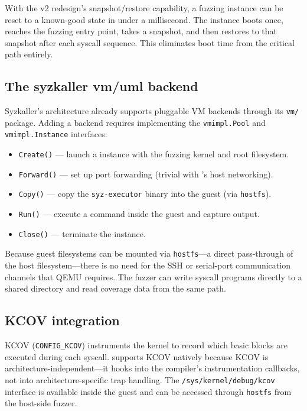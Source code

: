 With the v2 redesign's snapshot/restore capability, a \UML{} fuzzing
instance can be reset to a known-good state in under a millisecond.
The instance boots once, reaches the fuzzing entry point, takes a
snapshot, and then restores to that snapshot after each syscall sequence.
This eliminates boot time from the critical path entirely.

\subsection{The syzkaller vm/uml backend}

Syzkaller's architecture already supports pluggable VM backends through
its \texttt{vm/} package.  Adding a \UML{} backend requires implementing
the \texttt{vmimpl.Pool} and \texttt{vmimpl.Instance} interfaces:

\begin{itemize}[leftmargin=2em]
  \item \texttt{Create()} --- launch a \UML{} instance with the fuzzing
        kernel and root filesystem.
  \item \texttt{Forward()} --- set up port forwarding (trivial with \UML{}'s
        host networking).
  \item \texttt{Copy()} --- copy the \texttt{syz-executor} binary into the
        guest (via \texttt{hostfs}).
  \item \texttt{Run()} --- execute a command inside the guest and capture
        output.
  \item \texttt{Close()} --- terminate the instance.
\end{itemize}

Because \UML{} guest filesystems can be mounted via \texttt{hostfs}---a
direct pass-through of the host filesystem---there is no need for the
SSH or serial-port communication channels that QEMU requires.  The
fuzzer can write syscall programs directly to a shared directory and
read coverage data from the same path.

\subsection{KCOV integration}

KCOV (\texttt{CONFIG\_KCOV}) instruments the kernel to record which
basic blocks are executed during each syscall.  \UML{} supports KCOV
natively because KCOV is architecture-independent---it hooks into the
compiler's instrumentation callbacks, not into architecture-specific
trap handling.  The \texttt{/sys/kernel/debug/kcov} interface is
available inside the \UML{} guest and can be accessed through
\texttt{hostfs} from the host-side fuzzer.


